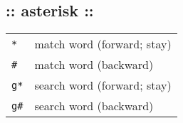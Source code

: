 \subsection{:: asterisk ::}
\begin{tabular}{@{}ll@{}}
    \verb!*!            & match word (forward; stay) \\
    \verb!#!            & match word (backward) \\
    \verb!g*!           & search word (forward; stay) \\
    \verb!g#!           & search word (backward) \\
\end{tabular}

